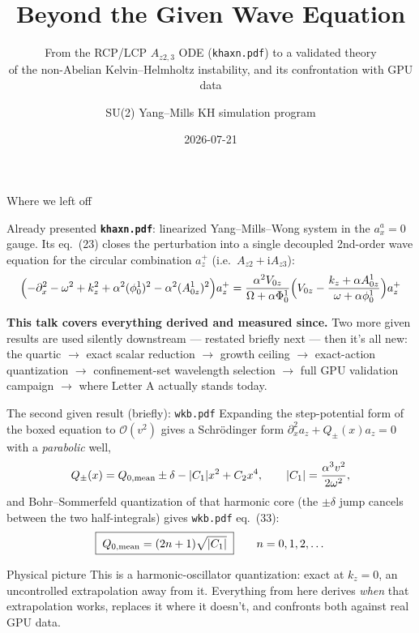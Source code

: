 \documentclass[aspectratio=169,11pt]{beamer}
\title{\textbf{Beyond the Given Wave Equation}}
\subtitle{From the RCP/LCP $A_{z2,3}$ ODE (\texttt{khaxn.pdf}) to a validated theory\\
of the non-Abelian Kelvin--Helmholtz instability, and its confrontation with GPU data}
\author{SU(2) Yang--Mills KH simulation program}
\date{2026-07-21}
\newenvironment{physpicture}{\begin{exampleblock}{Physical picture}}{\end{exampleblock}}
\newenvironment{given}{\begin{alertblock}{\textcolor{ymred!70!black}{Already presented}}}{\end{alertblock}}
\newcommand{\kz}{k_z}
\newcommand{\ii}{\mathrm{i}}
\begin{document}
\begin{frame}
\titlepage
\end{frame}

\begin{frame}{Where we left off}
\begin{given}
\textbf{\texttt{khaxn.pdf}}: linearized Yang--Mills--Wong system in the $a_x^a=0$ gauge.
Its eq.~(23) closes the perturbation into a single decoupled 2nd-order wave equation
for the circular combination $a_z^+$ (i.e.\ $A_{z2}+\ii A_{z3}$):
\[
\Bigl(-\partial_x^2-\omega^2+\kz^2+\alpha^2(\phi_0^1)^2-\alpha^2(A^1_{0z})^2\Bigr)a_z^+
=\frac{\alpha^2 V_{0z}}{\Omega+\alpha\Phi_0^1}
\Bigl(V_{0z}-\frac{\kz+\alpha A^1_{0z}}{\omega+\alpha\phi_0^1}\Bigr)a_z^+
\]
\end{given}
\vspace{0.15em}
\textbf{This talk covers everything derived and measured since.} Two more given
results are used silently downstream — restated briefly next — then it's all new:
the quartic $\to$ exact scalar reduction $\to$ growth ceiling $\to$ exact-action
quantization $\to$ confinement-set wavelength selection $\to$ full GPU validation
campaign $\to$ where Letter A actually stands today.
\end{frame}

\begin{frame}{The second given result (briefly): \texttt{wkb.pdf}}
Expanding the step-potential form of the boxed equation to $\mathcal O(v^2)$ gives a
Schr\"odinger form $\partial_x^2a_z+Q_\pm(x)a_z=0$ with a \emph{parabolic} well,
\[
Q_\pm(x)=Q_{0,\rm mean}\pm\delta-|C_1|x^2+C_2x^4,\qquad
|C_1|=\frac{\alpha^3v^2}{2\omega^2},
\]
and Bohr--Sommerfeld quantization of that harmonic core (the $\pm\delta$ jump cancels
between the two half-integrals) gives \texttt{wkb.pdf} eq.~(33):
\[
\boxed{\;Q_{0,\rm mean}=(2n+1)\sqrt{|C_1|}\;}\qquad n=0,1,2,\dots
\]
\begin{physpicture}
This is a harmonic-oscillator quantization: exact at $\kz=0$, an uncontrolled
extrapolation away from it. Everything from here derives \emph{when} that
extrapolation works, replaces it where it doesn't, and confronts both against
real GPU data.
\end{physpicture}
\end{frame}
\end{document}
